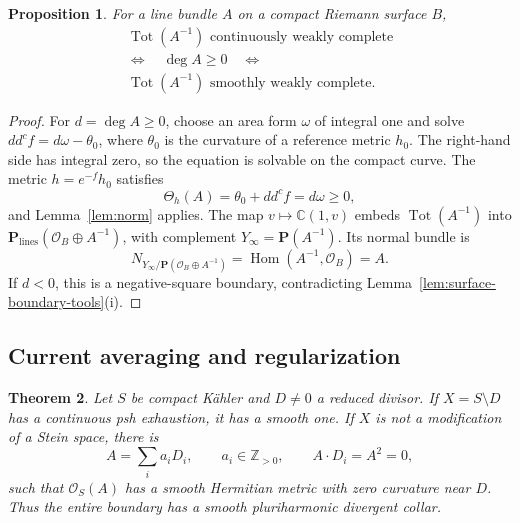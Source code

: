 \documentclass[11pt]{amsart}
\newtheorem{theorem}{Theorem}[section]
\newtheorem{proposition}[theorem]{Proposition}
\theoremstyle{definition}
\theoremstyle{remark}
\numberwithin{equation}{section}
\newcommand{\C}{\mathbb C}
\newcommand{\PP}{\mathbf P}
\newcommand{\OO}{\mathcal O}
\newcommand{\Tot}{\operatorname{Tot}}
\newcommand{\ddc}{dd^c}
\begin{document}
\begin{proposition}\label{cor:curve-total-space}
For a line bundle $A$ on a compact Riemann surface $B$,
\[
 \begin{gathered}
 \Tot(A^{-1})\text{ continuously weakly complete}\\
 \Longleftrightarrow\quad\deg A\ge0\quad\Longleftrightarrow\\
 \Tot(A^{-1})\text{ smoothly weakly complete}.
 \end{gathered}
\]
\end{proposition}
\begin{proof}
For $d=\deg A\ge0$, choose an area form $\omega$ of integral one
and solve $\ddc f=d\omega-\theta_0$, where $\theta_0$ is the
curvature of a reference metric $h_0$. The right-hand side has
integral zero, so the equation is solvable on the compact curve.
The metric $h=e^{-f}h_0$ satisfies
\[
 \Theta_h(A)=\theta_0+\ddc f=d\omega\ge0,
\]
and Lemma~\ref{lem:norm} applies. The map
$v\mapsto\C(1,v)$ embeds $\Tot(A^{-1})$ into
$\PP_{\mathrm{lines}}(\OO_B\oplus A^{-1})$, with complement
$Y_\infty=\PP(A^{-1})$. Its normal bundle is
\[
 N_{Y_\infty/\PP(\OO_B\oplus A^{-1})}
 =\operatorname{Hom}(A^{-1},\OO_B)=A.
\]
If $d<0$, this is a negative-square boundary, contradicting
Lemma~\ref{lem:surface-boundary-tools}\textup{(i)}.
\end{proof}

\subsection{Current averaging and regularization}
\label{subsec:divisor-regularization}
\begin{theorem}\label{thm:divisor-regularization}
Let $S$ be compact K\"ahler and $D\ne0$ a reduced divisor.
If $X=S\setminus D$ has a continuous psh exhaustion, it has a
smooth one. If $X$ is not a modification of a Stein space, there is
\[
 A=\sum_i a_iD_i,\qquad a_i\in\mathbb Z_{>0},\qquad
 A\cdot D_i=A^2=0,
\]
such that $\OO_S(A)$ has a smooth Hermitian metric with zero
curvature near $D$. Thus the entire boundary has a smooth
pluriharmonic divergent collar.
\end{theorem}
\end{document}

